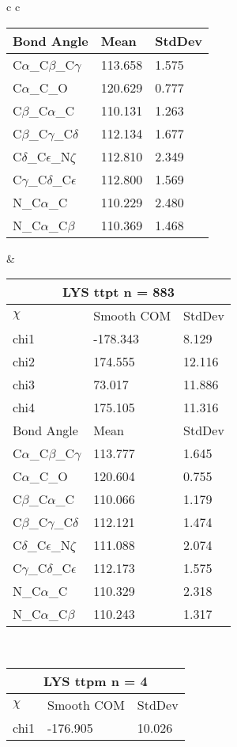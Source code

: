 \begin{longtable}{ c c }
\begin{tabular}{ l l l }
  Bond Angle   & Mean     & StdDev \\ \midrule
  C$\alpha$\_C$\beta$\_C$\gamma$ & 113.658 & 1.575\\
  C$\alpha$\_C\_O & 120.629 & 0.777\\
  C$\beta$\_C$\alpha$\_C & 110.131 & 1.263\\
  C$\beta$\_C$\gamma$\_C$\delta$ & 112.134 & 1.677\\
  C$\delta$\_C$\epsilon$\_N$\zeta$ & 112.810 & 2.349\\
  C$\gamma$\_C$\delta$\_C$\epsilon$ & 112.800 & 1.569\\
  N\_C$\alpha$\_C & 110.229 & 2.480\\
  N\_C$\alpha$\_C$\beta$ & 110.369 & 1.468\\
  \bottomrule
  \end{tabular}
  &
  \begin{tabular}{ l l l }
  \toprule
  \multicolumn{3}{c}{LYS \textbf{ttpt} n = 883} \\ \toprule
  $\chi$       & Smooth COM & StdDev \\ \midrule
  chi1 & -178.343 & 8.129 \\ 
  chi2 & 174.555 & 12.116 \\ 
  chi3 & 73.017 & 11.886 \\ 
  chi4 & 175.105 & 11.316 \\ \midrule
  Bond Angle   & Mean     & StdDev \\ \midrule
  C$\alpha$\_C$\beta$\_C$\gamma$ & 113.777 & 1.645\\
  C$\alpha$\_C\_O & 120.604 & 0.755\\
  C$\beta$\_C$\alpha$\_C & 110.066 & 1.179\\
  C$\beta$\_C$\gamma$\_C$\delta$ & 112.121 & 1.474\\
  C$\delta$\_C$\epsilon$\_N$\zeta$ & 111.088 & 2.074\\
  C$\gamma$\_C$\delta$\_C$\epsilon$ & 112.173 & 1.575\\
  N\_C$\alpha$\_C & 110.329 & 2.318\\
  N\_C$\alpha$\_C$\beta$ & 110.243 & 1.317\\
  \bottomrule
  \end{tabular}
  \\
  \begin{tabular}{ l l l }
  \toprule
  \multicolumn{3}{c}{LYS \textbf{ttpm} n = 4} \\ \toprule
  $\chi$       & Smooth COM & StdDev \\ \midrule
  chi1 & -176.905 & 10.026 \\ 

\end{tabular}
\end{longtable}

